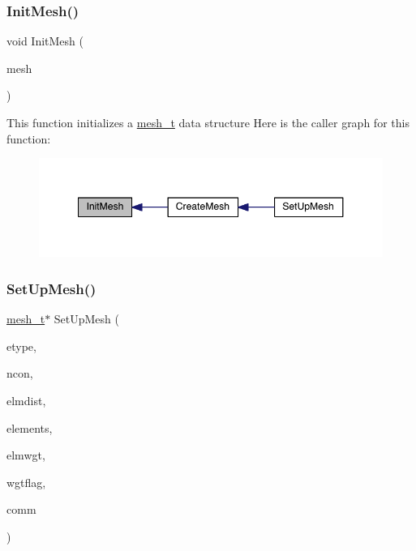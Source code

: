 \subsubsection{\texorpdfstring{Init\+Mesh()}{InitMesh()}}
{\footnotesize\ttfamily void Init\+Mesh (\begin{DoxyParamCaption}\item[{\hyperlink{a00738}{mesh\+\_\+t} $\ast$}]{mesh }\end{DoxyParamCaption})}

This function initializes a \hyperlink{a00738}{mesh\+\_\+t} data structure Here is the caller graph for this function\+:\nopagebreak
\begin{figure}[H]
\begin{center}
\leavevmode
\includegraphics[width=348pt]{a00380_a82cd62ea70eaae4395fee538d40cf12b_icgraph}
\end{center}
\end{figure}
\mbox{\label{a00380_a9f9b575b1270719a1d7ae34f89ed2dc5}} 
\subsubsection{\texorpdfstring{Set\+Up\+Mesh()}{SetUpMesh()}}
{\footnotesize\ttfamily \hyperlink{a00738}{mesh\+\_\+t}$\ast$ Set\+Up\+Mesh (\begin{DoxyParamCaption}\item[{\hyperlink{a00876_aaa5262be3e700770163401acb0150f52}{idx\+\_\+t} $\ast$}]{etype,  }\item[{\hyperlink{a00876_aaa5262be3e700770163401acb0150f52}{idx\+\_\+t} $\ast$}]{ncon,  }\item[{\hyperlink{a00876_aaa5262be3e700770163401acb0150f52}{idx\+\_\+t} $\ast$}]{elmdist,  }\item[{\hyperlink{a00876_aaa5262be3e700770163401acb0150f52}{idx\+\_\+t} $\ast$}]{elements,  }\item[{\hyperlink{a00876_aaa5262be3e700770163401acb0150f52}{idx\+\_\+t} $\ast$}]{elmwgt,  }\item[{\hyperlink{a00876_aaa5262be3e700770163401acb0150f52}{idx\+\_\+t} $\ast$}]{wgtflag,  }\item[{M\+P\+I\+\_\+\+Comm $\ast$}]{comm }\end{DoxyParamCaption})}

